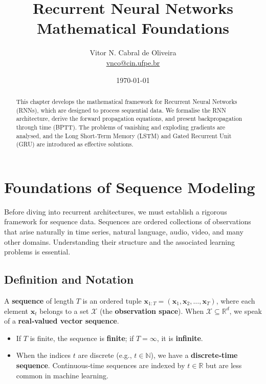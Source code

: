 \documentclass{tufte-handout}
\title{Recurrent Neural Networks \\ Mathematical Foundations}
\author{Vitor N. Cabral de Oliveira\\ \href{mailto:vnco@cin.ufpe.br}{vnco@cin.ufpe.br}}
\date{\today}
\begin{document}
\maketitle

\begin{abstract}
    This chapter develops the mathematical framework for Recurrent Neural Networks (RNNs), which are designed to process sequential data. We formalise the RNN architecture, derive the forward propagation equations, and present backpropagation through time (BPTT). The problems of vanishing and exploding gradients are analysed, and the Long Short‑Term Memory (LSTM) and Gated Recurrent Unit (GRU) are introduced as effective solutions.
\end{abstract}

\newpage
\hypersetup{linkcolor=wp-text}
\tableofcontents
\hypersetup{linkcolor=wp-primary}
\newpage


\section{Foundations of Sequence Modeling}

Before diving into recurrent architectures, we must establish a rigorous framework for sequence data. Sequences are ordered collections of observations that arise naturally in time series, natural language, audio, video, and many other domains. Understanding their structure and the associated learning problems is essential.

\subsection{Definition and Notation}

\begin{defn}[Sequence]
    A \textbf{sequence} of length $T$ is an ordered tuple $\mathbf{x}_{1:T} = (\mathbf{x}_1, \mathbf{x}_2, \dots, \mathbf{x}_T)$, where each element $\mathbf{x}_t$ belongs to a set $\mathcal{X}$ (the \textbf{observation space}). When $\mathcal{X} \subseteq \mathbb{R}^d$, we speak of a \textbf{real‑valued vector sequence}. 
    \begin{itemize}
        \item If $T$ is finite, the sequence is \textbf{finite}; if $T = \infty$, it is \textbf{infinite}.
        \item When the indices $t$ are discrete (e.g., $t \in \mathbb{N}$), we have a \textbf{discrete‑time sequence}. Continuous‑time sequences are indexed by $t \in \mathbb{R}$ but are less common in machine learning.
    \end{itemize}
\end{defn}
\end{document}
